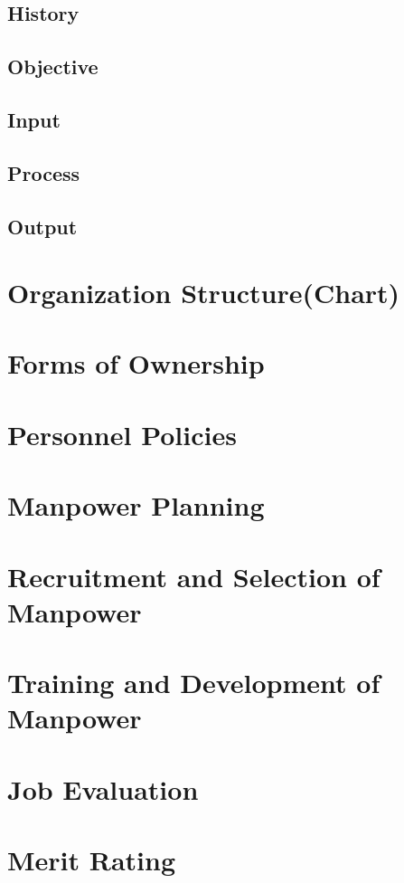 \documentclass[12pt, a4paper]{article}
\begin{document}
	\subsection{History}
	\subsection{Objective}
	\subsection{Input}
	\subsection{Process}
	\subsection{Output}
	\cleardoublepage
	\section{Organization Structure(Chart)}
	\cleardoublepage
	\section{Forms of Ownership}
	\cleardoublepage
	\section{Personnel Policies}
	\cleardoublepage
	\section{Manpower Planning}
	\cleardoublepage
	\section{Recruitment and Selection of Manpower}
	\cleardoublepage
	\section{Training and Development of Manpower}
	\cleardoublepage
	\section{Job Evaluation}
	\cleardoublepage
	\section{Merit Rating}
	\cleardoublepage
\end{document}
